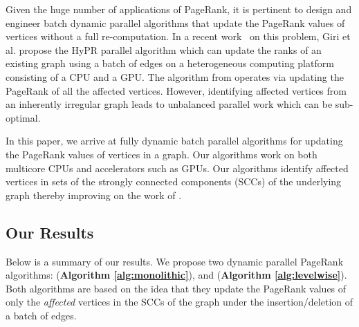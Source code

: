 Given the huge number of applications of PageRank, it is pertinent to design and engineer batch dynamic parallel algorithms that update the PageRank values of vertices without a full re-computation. In a recent work~\cite{hipc19} on this problem, Giri et al. propose the HyPR parallel algorithm which can update the ranks of an existing graph using a batch of edges on a heterogeneous computing platform consisting of a CPU and a GPU. The algorithm from \cite{hipc19} operates via updating the PageRank of all the affected vertices. However, identifying affected vertices from an inherently irregular graph leads to unbalanced parallel work which can be sub-optimal.

In this paper, we arrive at fully dynamic batch parallel algorithms for updating the PageRank values of vertices in a graph. Our algorithms work on both multicore CPUs and accelerators such as GPUs. Our algorithms identify affected vertices in sets of the strongly connected components (SCCs) of the underlying graph thereby improving on the work of \cite{hipc19}.




\subsection{Our Results}

Below is a summary of our results. We propose two dynamic parallel PageRank algorithms: \monolithicPR{} ({\bf Algorithm \ref{alg:monolithic}}), and \levelwisePR{} ({\bf Algorithm \ref{alg:levelwise}}). Both algorithms are based on the idea that they update the PageRank values of only the {\em affected} vertices in the SCCs of the graph under the insertion/deletion of a batch of edges.

